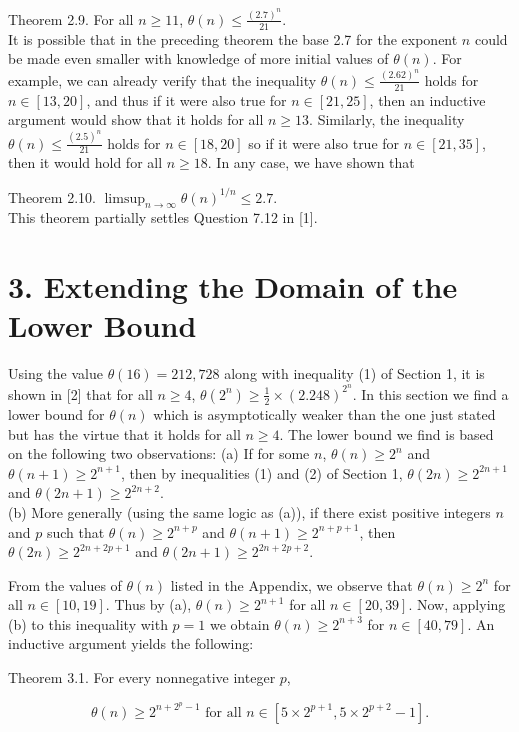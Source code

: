 \documentclass[10pt]{article}
\begin{document}
Theorem 2.9. For all $n \geq 11$, $\theta(n) \leq \frac{(2.7)^{n}}{21}$.\\
It is possible that in the preceding theorem the base 2.7 for the exponent $n$ could be made even smaller with knowledge of more initial values of $\theta(n)$. For example, we can already verify that the inequality $\theta(n) \leq \frac{(2.62)^{n}}{21}$ holds for $n \in [13,20]$, and thus if it were also true for $n \in [21,25]$, then an inductive argument would show that it holds for all $n \geq 13$. Similarly, the inequality $\theta(n) \leq \frac{(2.5)^{n}}{21}$ holds for $n \in [18,20]$ so if it were also true for $n \in [21,35]$, then it would hold for all $n \geq 18$. In any case, we have shown that

Theorem 2.10. $\displaystyle \limsup_{n \to \infty} \theta(n)^{1/n} \leq 2.7$.\\[0pt]
This theorem partially settles Question 7.12 in [1].

\section*{3. Extending the Domain of the Lower Bound}
Using the value $\theta(16)=212,728$ along with inequality (1) of Section 1, it is shown in [2] that for all $n \geq 4$, $\theta\left(2^{n}\right) \geq \frac{1}{2} \times(2.248)^{2^{n}}$. In this section we find a lower bound for $\theta(n)$ which is asymptotically weaker than the one just stated but has the virtue that it holds for all $n \geq 4$. The lower bound we find is based on the following two observations:
(a) If for some $n$, $\theta(n) \geq 2^{n}$ and $\theta(n+1) \geq 2^{n+1}$, then by inequalities (1) and (2) of Section 1, $\theta(2 n) \geq 2^{2 n+1}$ and $\theta(2 n+1) \geq 2^{2 n+2}$.\\
(b) More generally (using the same logic as (a)), if there exist positive integers $n$ and $p$ such that $\theta(n) \geq 2^{n+p}$ and $\theta(n+1) \geq 2^{n+p+1}$, then $\theta(2 n) \geq 2^{2 n+2 p+1}$ and $\theta(2 n+1) \geq 2^{2 n+2 p+2}$.

From the values of $\theta(n)$ listed in the Appendix, we observe that $\theta(n) \geq 2^{n}$ for all $n \in [10,19]$. Thus by (a), $\theta(n) \geq 2^{n+1}$ for all $n \in [20,39]$. Now, applying (b) to this inequality with $p=1$ we obtain $\theta(n) \geq 2^{n+3}$ for $n \in [40,79]$. An inductive argument yields the following:

Theorem 3.1. For every nonnegative integer $p$,

$$
\theta(n) \geq 2^{n+2^{p}-1} \text{ for all } n \in\left[5 \times 2^{p+1}, 5 \times 2^{p+2}-1\right] .
$$
\end{document}
